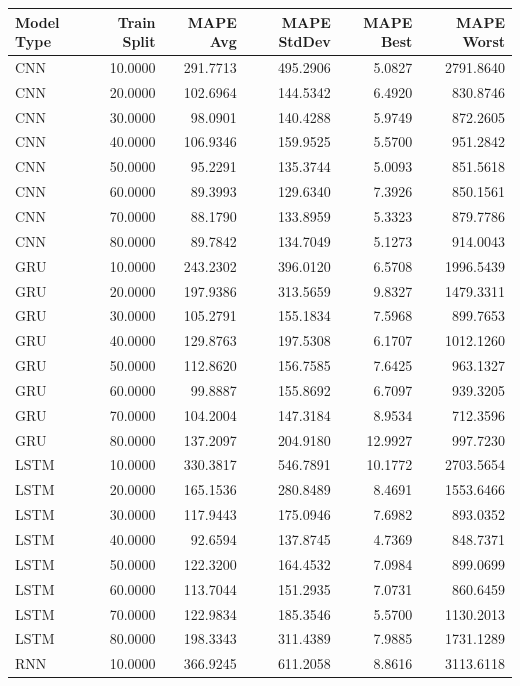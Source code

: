 \begin{tabular}{lrrrrr}
\toprule
Model Type & Train Split & MAPE Avg & MAPE StdDev & MAPE Best & MAPE Worst \\
\midrule
CNN & 10.0000 & 291.7713 & 495.2906 & 5.0827 & 2791.8640 \\
CNN & 20.0000 & 102.6964 & 144.5342 & 6.4920 & 830.8746 \\
CNN & 30.0000 & 98.0901 & 140.4288 & 5.9749 & 872.2605 \\
CNN & 40.0000 & 106.9346 & 159.9525 & 5.5700 & 951.2842 \\
CNN & 50.0000 & 95.2291 & 135.3744 & 5.0093 & 851.5618 \\
CNN & 60.0000 & 89.3993 & 129.6340 & 7.3926 & 850.1561 \\
CNN & 70.0000 & 88.1790 & 133.8959 & 5.3323 & 879.7786 \\
CNN & 80.0000 & 89.7842 & 134.7049 & 5.1273 & 914.0043 \\
GRU & 10.0000 & 243.2302 & 396.0120 & 6.5708 & 1996.5439 \\
GRU & 20.0000 & 197.9386 & 313.5659 & 9.8327 & 1479.3311 \\
GRU & 30.0000 & 105.2791 & 155.1834 & 7.5968 & 899.7653 \\
GRU & 40.0000 & 129.8763 & 197.5308 & 6.1707 & 1012.1260 \\
GRU & 50.0000 & 112.8620 & 156.7585 & 7.6425 & 963.1327 \\
GRU & 60.0000 & 99.8887 & 155.8692 & 6.7097 & 939.3205 \\
GRU & 70.0000 & 104.2004 & 147.3184 & 8.9534 & 712.3596 \\
GRU & 80.0000 & 137.2097 & 204.9180 & 12.9927 & 997.7230 \\
LSTM & 10.0000 & 330.3817 & 546.7891 & 10.1772 & 2703.5654 \\
LSTM & 20.0000 & 165.1536 & 280.8489 & 8.4691 & 1553.6466 \\
LSTM & 30.0000 & 117.9443 & 175.0946 & 7.6982 & 893.0352 \\
LSTM & 40.0000 & 92.6594 & 137.8745 & 4.7369 & 848.7371 \\
LSTM & 50.0000 & 122.3200 & 164.4532 & 7.0984 & 899.0699 \\
LSTM & 60.0000 & 113.7044 & 151.2935 & 7.0731 & 860.6459 \\
LSTM & 70.0000 & 122.9834 & 185.3546 & 5.5700 & 1130.2013 \\
LSTM & 80.0000 & 198.3343 & 311.4389 & 7.9885 & 1731.1289 \\
RNN & 10.0000 & 366.9245 & 611.2058 & 8.8616 & 3113.6118 \\

\end{tabular}
